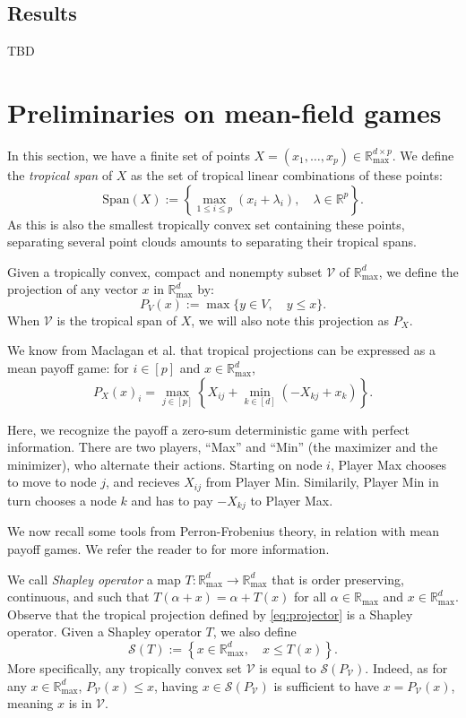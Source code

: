 \documentclass[oneside,english,a4paper]{amsart}
\numberwithin{equation}{section}
\numberwithin{figure}{section}
\theoremstyle{plain}
\theoremstyle{definition}
\theoremstyle{plain}
\theoremstyle{remark}
\theoremstyle{plain}
\theoremstyle{definition}
\theoremstyle{definition}
\begin{document}
\subsection*{Results}

TBD

\section{Preliminaries on mean-field games}

In this section, we have a finite set of points $X=(x_{1},\ldots,x_{p})\in\mathbb{R}_{\text{max}}^{d\times p}$.
We define the \emph{tropical span} of $X$ as the set of tropical
linear combinations of these points:
\[
\text{Span}(X):=\left\{\max_{1\le i\le p}(x_{i}+\lambda_{i}),\quad\lambda\in\mathbb{R}^{p}\right\}.
\]
As this is also the smallest tropically convex set containing these
points, separating several point clouds amounts to separating their
tropical spans.

Given a tropically convex, compact and nonempty subset $\mathcal{V}$
of $\mathbb{R}_{\max}^{d}$, we define the projection of any vector
$x$ in $\mathbb{R}_{\max}^{d}$ by:
\[
P_{V}(x):=\max\{y\in V,\quad y\le x\}.
\]
When $\mathcal{V}$ is the tropical span of $X$, we will also note
this projection as $P_{X}$.

We know from Maclagan et al. \cite{Maclagan2015} that tropical projections
can be expressed as a mean payoff game: for $i\in[p]$ and $x\in\mathbb{R}_{\max}^{d}$,
\begin{equation}
P_{X}(x)_{i}=\max_{j\in[p]}\left\{X_{ij}+\min_{k\in[d]}(-X_{kj}+x_{k})\right\}.\label{eq:projector}
\end{equation}

Here, we recognize the payoff a zero-sum deterministic game with perfect
information. There are two players, ``Max'' and ``Min'' (the maximizer
and the minimizer), who alternate their actions. Starting on node
$i$, Player Max chooses to move to node $j$, and recieves $X_{ij}$
from Player Min. Similarily, Player Min in turn chooses a node $k$
and has to pay $-X_{kj}$ to Player Max.

We now recall some tools from Perron-Frobenius theory, in relation
with mean payoff games. We refer the reader to \cite{AKIAN2012} for more
information.

We call \emph{Shapley operator} a map $T:\mathbb{R}_{\max}^{d}\rightarrow\mathbb{R}_{\max}^{d}$
that is order preserving, continuous, and such that $T(\alpha+x)=\alpha+T(x)$
for all $\alpha\in\mathbb{R}_{\max}$ and $x\in\mathbb{R}_{\max}^{d}$.
Observe that the tropical projection defined by \ref{eq:projector}
is a Shapley operator. Given a Shapley operator $T$, we also define
\[
\mathcal{S}(T):=\left\{x\in\mathbb{R}_{\max}^{d},\quad x\le T(x)\right\}.
\]
More specifically, any tropically convex set $\mathcal{V}$ is equal
to $\mathcal{S}(P_{\mathcal{V}})$. Indeed, as for any $x\in\mathbb{R}_{\text{max}}^{d}$,
$P_{\mathcal{V}}(x)\le x$, having $x\in\mathcal{S}(P_{\mathcal{V}})$
is sufficient to have $x=P_{\mathcal{V}}(x)$, meaning $x$ is in
$\mathcal{V}$.
\end{document}
